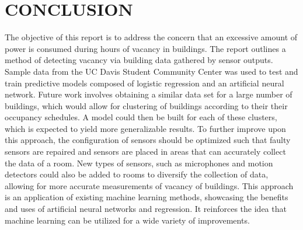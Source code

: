 \documentclass[letterpaper, 12 pt, conference]{ieeeconf}  %
\begin{document}
\section{CONCLUSION}

The objective of this report is to address the concern that an excessive amount of power is consumed during hours of vacancy in buildings. The report outlines a method of detecting vacancy via building data gathered by sensor outputs. Sample data from the UC Davis Student Community Center was used to test and train predictive models composed of logistic regression and an artificial neural network. Future work involves obtaining a similar data set for a large number of buildings, which would allow for clustering of buildings according to their their occupancy schedules. A model could then be built for each of these clusters, which is expected to yield more generalizable results. To further improve upon this approach, the configuration of sensors should be optimized such that faulty sensors are repaired and sensors are placed in areas that can accurately collect the data of a room. New types of sensors, such as microphones and motion detectors could also be added to rooms to diversify the collection of data, allowing for more accurate measurements of vacancy of buildings. This approach is an application of existing machine learning methods, showcasing the benefits and uses of artificial neural networks and regression.  It reinforces the idea that machine learning can be utilized for a wide variety of improvements.

\addtolength{\textheight}{-12cm}   %







\end{document}
